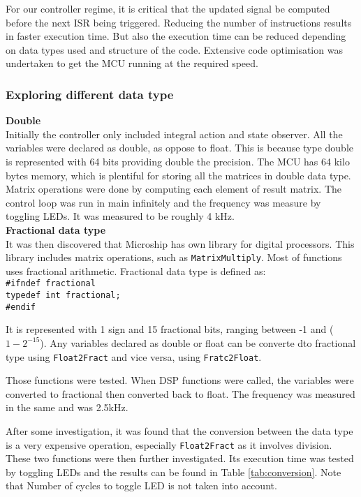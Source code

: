 For our controller regime, it is critical that the updated signal be computed before the next ISR being triggered. Reducing the number of instructions results in faster execution time. But also the execution time can be reduced depending on data types used and structure of the code. Extensive code optimisation was undertaken to get the MCU running at the required speed. 

\subsubsection{Exploring different data type}



\textbf{Double}\\
Initially the controller only included integral action and state observer. All the variables were declared as double, as oppose to float. This is because type double is represented with 64 bits providing double the precision. The MCU has 64 kilo bytes memory, which is plentiful for storing all the matrices in double data type. 
Matrix operations were done by computing each element of result matrix. The control loop was run in main infinitely and the frequency was measure by toggling LEDs. It was measured to be roughly 4 kHz. \\

\textbf{Fractional data type}\\
It was then discovered that Microship has own library for digital processors. This library includes matrix operations, such as \texttt{MatrixMultiply}. Most of functions uses fractional arithmetic. Fractional data type is defined as:\\
\texttt{\#ifndef fractional}\\
    \texttt{typedef int fractional;}\\
\texttt{\#endif}

It is represented with 1 sign and 15 fractional bits, ranging between -1 and ($1-2^{-15}$). Any variables declared as double or float can be converte dto fractional type using \texttt{Float2Fract} and vice versa, using \texttt{Fratc2Float}. 

Those functions were tested. When DSP functions were called, the variables were converted to fractional then converted back to float. The frequency was measured in the same and was 2.5kHz. 

After some investigation, it was found that the conversion between the data type is a very expensive operation, especially \texttt{Float2Fract} as it involves division. These two functions were then further investigated. Its execution time was tested by toggling LEDs and the results can be found in Table \ref{tab:conversion}. Note that Number of cycles to toggle LED is not taken into account. 


